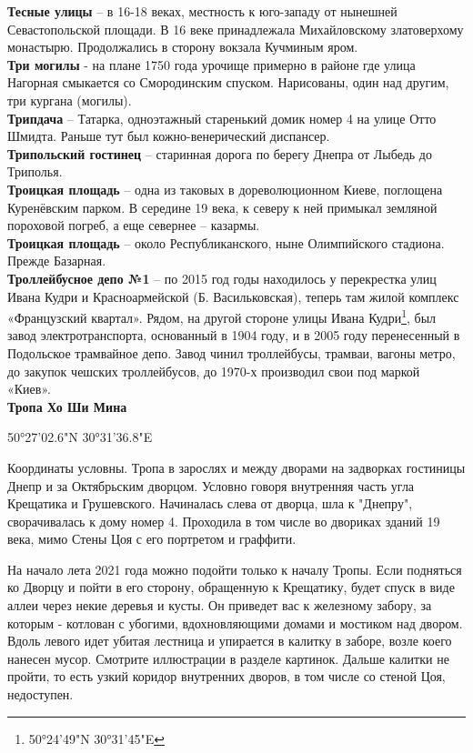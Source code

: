 \textbf{Тесные улицы} – в 16-18 веках, местность к юго-западу от нынешней Севастопольской площади. В 16 веке принадлежала Михайловскому златоверхому монастырю. Продолжались в сторону вокзала Кучминым яром.\\

\textbf{Три могилы} - на плане 1750 года урочище примерно в районе где улица Нагорная смыкается со Смородинским спуском. Нарисованы, один над другим, три кургана (могилы).\\

\textbf{Трипдача} – Татарка, одноэтажный старенький домик номер 4 на улице Отто Шмидта. Раньше тут был кожно-венерический диспансер.\\

\textbf{Трипольский гостинец} – старинная дорога по берегу Днепра от Лыбедь до Триполья.\\

\textbf{Троицкая площадь} – одна из таковых в дореволюционном Киеве, поглощена Куренёвским парком. В середине 19 века, к северу к ней примыкал земляной пороховой погреб, а еще севернее – казармы.\\

\textbf{Троицкая площадь} – около Республиканского, ныне Олимпийского стадиона. Прежде Базарная.\\

\textbf{Троллейбусное депо №1} – по 2015 год годы находилось у перекрестка улиц Ивана Кудри и Красноармейской (Б. Васильковская), теперь там жилой комплекс «Французский квартал». Рядом, на другой стороне улицы Ивана Кудри\footnote{50°24'49"N 30°31'45"E}, был завод электротранспорта, основанный в 1904 году, и в 2005 году перенесенный в Подольское трамвайное депо. Завод чинил троллейбусы, трамваи, вагоны метро, до закупок чешских троллейбусов, до 1970-х производил свои под маркой «Киев».\\

\textbf{Тропа Хо Ши Мина}

50°27'02.6"N 30°31'36.8"E

Координаты условны. Тропа в зарослях и между дворами на задворках гостиницы Днепр и за Октябрьским дворцом. Условно говоря внутренняя часть угла Крещатика и Грушевского. Начиналась слева от дворца, шла к "Днепру", сворачивалась к дому номер 4. Проходила в том числе во двориках зданий 19 века, мимо Стены Цоя с его портретом и граффити.

На начало лета 2021 года можно подойти только к началу Тропы. Если подняться ко Дворцу и пойти в его сторону, обращенную к Крещатику, будет спуск в виде аллеи через некие деревья и кусты. Он приведет вас к железному забору, за которым - котлован с убогими, вдохновляющими домами и мостиком над двором. Вдоль левого идет убитая лестница и упирается в калитку в заборе, возле коего нанесен мусор. Смотрите иллюстрации в разделе картинок. Дальше калитки не пройти, то есть узкий коридор внутренних дворов, в том числе со стеной Цоя, недоступен.

